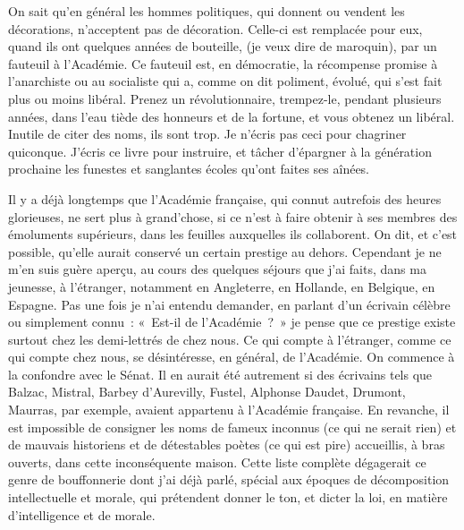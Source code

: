 \documentclass[french,twoside]{book} %
\begin{document}
On sait qu’en général les hommes politiques, qui donnent ou vendent les décorations, n’acceptent pas de décoration. Celle-ci est remplacée pour eux, quand ils ont quelques années de bouteille, (je veux dire de maroquin), par un fauteuil à l’Académie. Ce fauteuil est, en démocratie, la récompense promise à l’anarchiste ou au socialiste qui a, comme on dit poliment, évolué, qui s’est fait plus ou moins libéral. Prenez un révolutionnaire, trempez-le, pendant plusieurs années, dans l’eau tiède des honneurs et de la fortune, et vous obtenez un libéral. Inutile de citer des noms, ils sont trop. Je n’écris pas ceci pour chagriner quiconque. J’écris ce livre pour instruire, et tâcher d’épargner à la génération prochaine les funestes et sanglantes écoles qu’ont faites ses aînées.\par
Il y a déjà longtemps que l’Académie française, qui connut autrefois des heures glorieuses, ne sert plus à grand’chose, si ce n’est à faire obtenir à ses membres des émoluments supérieurs, dans les feuilles auxquelles ils collaborent. On dit, et c’est possible, qu’elle aurait conservé un certain prestige au dehors. Cependant je ne m’en suis guère aperçu, au cours des quelques séjours que j’ai faits, dans ma jeunesse, à l’étranger, notamment en Angleterre, en Hollande, en Belgique, en Espagne. Pas une fois je n’ai entendu demander, en parlant d’un écrivain célèbre ou simplement connu : « Est-il de l’Académie ? » je pense que ce prestige existe surtout chez les demi-lettrés de chez nous. Ce qui compte à l’étranger, comme ce qui compte chez nous, se désintéresse, en général, de l’Académie. On commence à la confondre avec le Sénat. Il en aurait été autrement si des écrivains tels que Balzac, Mistral, Barbey d’Aurevilly, Fustel, Alphonse Daudet, Drumont, Maurras, par exemple, avaient appartenu à l’Académie française. En revanche, il est impossible de consigner les noms de fameux inconnus (ce qui ne serait rien) et de mauvais historiens et de détestables poètes (ce qui est pire) accueillis, à bras ouverts, dans cette inconséquente maison. Cette liste complète dégagerait ce genre de bouffonnerie dont j’ai déjà parlé, spécial aux époques de décomposition intellectuelle et morale, qui prétendent donner le ton, et dicter la loi, en matière d’intelligence et de morale.\par
\end{document}
